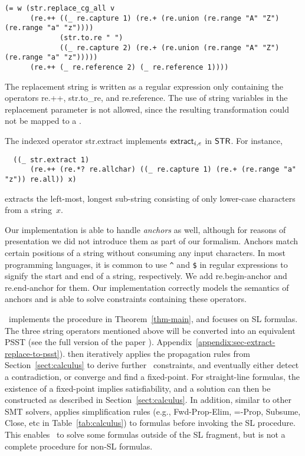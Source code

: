 {\small
\begin{verbatim}
(= w (str.replace_cg_all v
      (re.++ ((_ re.capture 1) (re.+ (re.union (re.range "A" "Z") (re.range "a" "z"))))
             (str.to.re " ") 
             ((_ re.capture 2) (re.+ (re.union (re.range "A" "Z") (re.range "a" "z")))))
      (re.++ (_ re.reference 2) (_ re.reference 1))))
\end{verbatim}
}

The replacement string is written as a regular expression only
containing the operators {\sf re.++}, {\sf str.to\_re}, and {\sf
  re.reference}. The use of string variables in the replacement
parameter is not allowed, since the resulting transformation could
not be mapped to a \PSST.

The indexed operator {\sf str.extract} implements $\mathsf{extract}_{i, e}$ in
$\mathsf{STR}$. For instance,

{\small
\begin{verbatim}
  ((_ str.extract 1)
      (re.++ (re.*? re.allchar) ((_ re.capture 1) (re.+ (re.range "a" "z")) re.all)) x)
\end{verbatim}
}

\noindent
extracts the left-most, longest sub-string consisting of only lower-case
characters from a string~$x$.

Our implementation is able to handle \textit{anchors} as well,
although for reasons of presentation we did not introduce them as part
of our formalism. Anchors match certain
positions of a string without consuming any input characters. In most
programming languages, it is common to use \verb!^!
and
\verb!$! in regular expressions to signify the start and end of a
string, respectively. We add \textsf{re.begin-anchor} and
\textsf{re.end-anchor} for them. Our implementation correctly models
the semantics of anchors and is able to solve constraints containing
these operators.

\ostrich\ implements the procedure in Theorem~\ref{thm-main}, and
focuses on SL formulas. The three string operators mentioned above
will be converted into an equivalent PSST (see \ifproceeding the full
version of the paper \cite{popl22-full}).  \else
Appendix~\ref{appendix:sec-extract-replace-to-psst}). \fi {\ostrich}
then iteratively applies the propagation rules from
Section~\ref{sect:calculus} to derive further \regexp\ constraints,
and eventually either detect a contradiction, or converge and find a
fixed-point. For straight-line formulas, the existence of a
fixed-point implies satisfiability, and a solution can then be
constructed as described in Section~\ref{sect:calculus}.  In addition,
similar to other SMT solvers, {\ostrich} applies simplification rules
(e.g., {\sf Fwd-Prop-Elim, =-Prop, Subsume, Close}, etc in
Table~\ref{tab:calculus}) to formulas before invoking the SL
procedure.  This enables \ostrich\ to solve some formulas outside of the SL
fragment, but is not a complete procedure for non-SL formulas.

